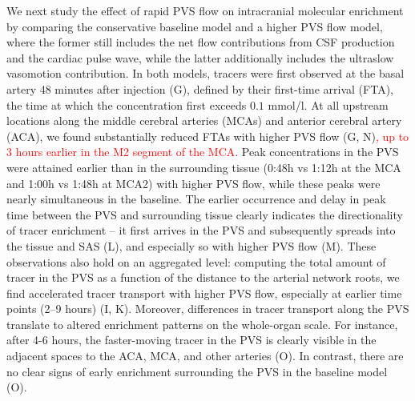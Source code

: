 \documentclass[fleqn,10pt]{wlscirep}
\newcommand{\discuss}[1]{\textcolor{red}{#1}}
\begin{document}
We next study the effect of rapid PVS flow on intracranial molecular
enrichment by comparing the conservative baseline model and a higher
PVS flow model, where the former still includes the net flow
contributions from CSF production and the cardiac pulse wave, while
the latter additionally includes the ultraslow vasomotion
contribution. In both models, tracers were first observed at the basal
artery 48 minutes after injection (G), defined by their
first-time arrival (FTA), the time at which the concentration first
exceeds $0.1$ mmol/l. At all upstream locations along the middle
cerebral arteries (MCAs) and anterior cerebral artery (ACA), we found
substantially reduced FTAs with higher PVS flow (G,
N)\discuss{, up to 3 hours earlier in the M2 segment of the MCA}. Peak
concentrations in the PVS were attained earlier than in the
surrounding tissue (0:48h vs 1:12h at the MCA and 1:00h vs 1:48h at
MCA2) with higher PVS flow, while these peaks were nearly simultaneous
in the baseline. The earlier occurrence and delay in peak time between
the PVS and surrounding tissue clearly indicates the directionality of
tracer enrichment -- it first arrives in the PVS and subsequently
spreads into the tissue and SAS (L), and especially so with higher PVS
flow (M). These observations also hold on an aggregated level: computing
the total amount of tracer in the PVS as a function of the distance to
the arterial network roots, we find accelerated tracer transport with
higher PVS flow, especially at earlier time points (2--9 hours)
(I, K). Moreover, differences in tracer transport along
the PVS translate to altered enrichment patterns on the whole-organ
scale. For instance, after 4-6 hours, the faster-moving tracer in the
PVS is clearly visible in the adjacent spaces to the ACA, MCA, and
other arteries (O). In contrast, there are no clear
signs of early enrichment surrounding the PVS in the baseline model
(O).
\end{document}
